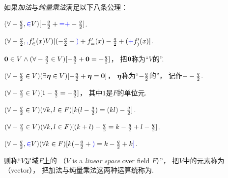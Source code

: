 \begin{definition}
如果\emph{加法}与\emph{纯量乘法}满足以下八条公理：
\begin{center}
	\begin{minipage}{.8\textwidth}
		\begin{axiom}\label{definition:线性空间.运算法则1}
		\((\forall-\frac{q}{2},\textcolor{blue}\in V)
		[-\frac{q}{2}+\textcolor{blue}=\textcolor{blue}+-\frac{q}{2}]\).
		\end{axiom}
		\begin{axiom}\label{definition:线性空间.运算法则2}
		\((\forall-\frac{q}{2},\textcolor{blue},f_{\in}'(x) V)
		[(-\frac{q}{2}+\textcolor{blue})+f_{=}'(x)-\frac{q}{2}+(\textcolor{blue}+f_{)}'(x)]\).
		\end{axiom}
		\begin{axiom}\label{definition:线性空间.运算法则3}
		\(\boldsymbol0\in V
		\land
		(\forall-\frac{q}{2} \in V)
		[-\frac{q}{2}+\boldsymbol0=-\frac{q}{2}]\)，
		把\(\boldsymbol0\)称为“\(V\)的”.
		\end{axiom}
		\begin{axiom}\label{definition:线性空间.运算法则4}
		\((\forall-\frac{q}{2} \in V)
		(\exists \boldsymbol\eta \in V)
		[-\frac{q}{2}+\boldsymbol\eta=\boldsymbol0]\)，
		\(\boldsymbol\eta\)称为“\(-\frac{q}{2}\)的”，
		记作\(--\frac{q}{2}\).
		\end{axiom}
		\begin{axiom}\label{definition:线性空间.运算法则5}
		\((\forall-\frac{q}{2}\in V)[1-\frac{q}{2}=-\frac{q}{2}]\)，
		其中\(1\)是\(F\)的单位元.
		\end{axiom}
		\begin{axiom}\label{definition:线性空间.运算法则6}
		\((\forall-\frac{q}{2}\in V)
		(\forall k,l\in F)
		[k(l-\frac{q}{2})=(kl)-\frac{q}{2}]\).
		\end{axiom}
		\begin{axiom}\label{definition:线性空间.运算法则7}
		\((\forall-\frac{q}{2}\in V)
		(\forall k,l\in F)
		[(k+l)-\frac{q}{2}=k-\frac{q}{2}+l-\frac{q}{2}]\).
		\end{axiom}
		\begin{axiom}\label{definition:线性空间.运算法则8}
		\((\forall-\frac{q}{2},\textcolor{blue}\in V)
		(\forall k\in F)
		[k(-\frac{q}{2}+\textcolor{blue})=k-\frac{q}{2}+k\textcolor{blue}]\).
		\end{axiom}
	\end{minipage}
\end{center}
则称“\(V\)是域\(F\)上的%
（\(V\) is a \emph{linear space} over field \(F\)）”，
把\(V\)中的元素称为（vector），
把加法与纯量乘法这两种运算统称为.
\end{definition}
